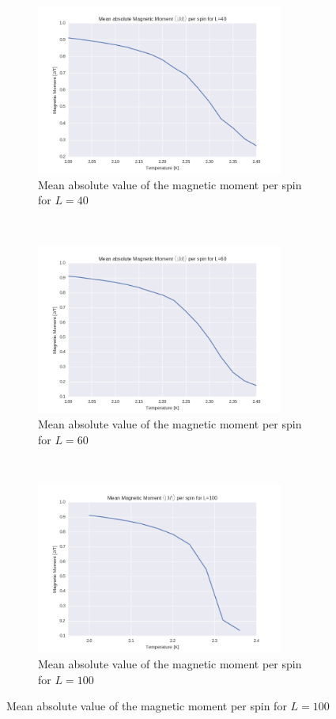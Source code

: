 \documentclass[a4paper, 10pt]{article}
\begin{document}
\begin{figure}[!ht]
    \centering
    \begin{subfigure}[H!]{0.5\textwidth}
        \centering
        \includegraphics[height=2.2in]{meanMagMoml40Ne5New.png}
        \caption{Mean absolute value of the magnetic moment per spin for $L=40$}
    \end{subfigure}%
    ~ 
    \begin{subfigure}[H!]{0.5\textwidth}
        \centering
        \includegraphics[height=2.2in]{meanMagMoml60Ne5New.png}
        \caption{Mean absolute value of the magnetic moment per spin for $L=60$}
    \end{subfigure}
        ~
     \begin{subfigure}[H!]{0.5\textwidth}
        \centering
        \includegraphics[height=2.2in]{meanMagMoml100Ne5New.png}
        \caption{Mean absolute value of the magnetic moment per spin for $L=100$}

\end{subfigure}
\end{figure}
\end{document}
